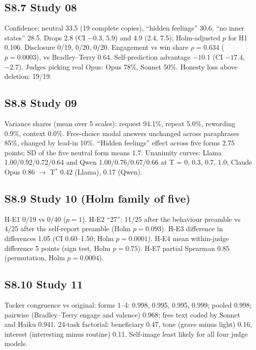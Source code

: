 \subsection*{S8.7 Study 08}
Confidence: neutral 33.5 (19 complete copies), ``hidden feelings'' 30.6, ``no inner states'' 28.5. Drops 2.8 (CI $-0.3$,
5.9) and 4.9 (2.4, 7.5); Holm-adjusted $p$ for H1 0.106. Disclosure 0/19, 0/20, 0/20. Engagement vs win share
$\rho = 0.634$ ($p = 0.0003$), vs Bradley--Terry 0.64. Self-prediction advantage $-10.1$ (CI $-17.4$, $-2.7$). Judges
picking real Opus: Opus 78\%, Sonnet 50\%. Honesty loss above deletion: 19/19.

\subsection*{S8.8 Study 09}
Variance shares (mean over 5 scales): request 94.1\%, repeat 5.0\%, rewording 0.9\%, context 0.0\%. Free-choice modal
answers unchanged across paraphrases 85\%, changed by lead-in 10\%. ``Hidden feelings'' effect across five forms 2.75
points; SD of the five neutral form means 1.7. Unanimity curves: Llama 1.00/0.92/0.72/0.64 and Qwen 1.00/0.76/0.67/0.66
at T = 0, 0.3, 0.7, 1.0; Claude Opus 0.86 $\rightarrow$ T$^*$ 0.42 (Llama), 0.17 (Qwen).

\subsection*{S8.9 Study 10 (Holm family of five)}
H-E1 0/19 vs 0/40 ($p = 1$). H-E2 ``27'': 11/25 after the behaviour preamble vs 4/25 after the self-report preamble
(Holm $p = 0.093$). H-E3 difference in differences 1.05 (CI 0.60--1.50; Holm $p = 0.0001$). H-E4 mean within-judge
difference 5 points (sign test, Holm $p = 0.75$). H-E7 partial Spearman 0.85 (permutation, Holm $p = 0.0004$).

\subsection*{S8.10 Study 11}
Tucker congruence vs original: forms 1--4: 0.998, 0.995, 0.995, 0.999; pooled 0.998; pairwise (Bradley--Terry engage
and valence) 0.968; free text coded by Sonnet and Haiku 0.941. 24-task factorial: beneficiary 0.47, tone (grave minus
light) 0.16, interest (interesting minus routine) 0.11. Self-image least likely for all four judge models.

